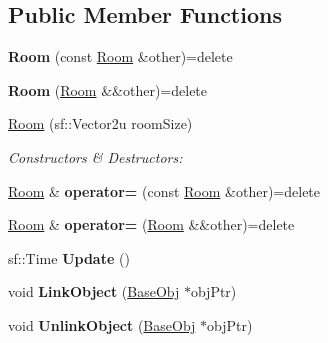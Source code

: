 \subsection*{Public Member Functions}
\begin{DoxyCompactItemize}
\item 
\hypertarget{class_helios_1_1_room_adde05da30e6a7923349d3682f77a595e}{}{\bfseries Room} (const \hyperlink{class_helios_1_1_room}{Room} \&other)=delete\label{class_helios_1_1_room_adde05da30e6a7923349d3682f77a595e}

\item 
\hypertarget{class_helios_1_1_room_a49dee88dbca1430546f49dedda0ef88a}{}{\bfseries Room} (\hyperlink{class_helios_1_1_room}{Room} \&\&other)=delete\label{class_helios_1_1_room_a49dee88dbca1430546f49dedda0ef88a}

\item 
\hypertarget{class_helios_1_1_room_a069b54c002742b2e943e281520654d43}{}\hyperlink{class_helios_1_1_room_a069b54c002742b2e943e281520654d43}{Room} (sf\+::\+Vector2u room\+Size)\label{class_helios_1_1_room_a069b54c002742b2e943e281520654d43}

\begin{DoxyCompactList}\small\item\em Constructors \& Destructors\+: \end{DoxyCompactList}\item 
\hypertarget{class_helios_1_1_room_ac4529d35e99e767f434e0c33f922257a}{}\hyperlink{class_helios_1_1_room}{Room} \& {\bfseries operator=} (const \hyperlink{class_helios_1_1_room}{Room} \&other)=delete\label{class_helios_1_1_room_ac4529d35e99e767f434e0c33f922257a}

\item 
\hypertarget{class_helios_1_1_room_a9f5645c1ec1a46c98ee7621c7a327723}{}\hyperlink{class_helios_1_1_room}{Room} \& {\bfseries operator=} (\hyperlink{class_helios_1_1_room}{Room} \&\&other)=delete\label{class_helios_1_1_room_a9f5645c1ec1a46c98ee7621c7a327723}

\item 
\hypertarget{class_helios_1_1_room_a26dd287e7d05d6157b97bd42ca4c5f54}{}sf\+::\+Time {\bfseries Update} ()\label{class_helios_1_1_room_a26dd287e7d05d6157b97bd42ca4c5f54}

\item 
\hypertarget{class_helios_1_1_room_a1dc648407daeb69bed664c1b6aca899d}{}void {\bfseries Link\+Object} (\hyperlink{class_helios_1_1_base_obj}{Base\+Obj} $\ast$obj\+Ptr)\label{class_helios_1_1_room_a1dc648407daeb69bed664c1b6aca899d}

\item 
\hypertarget{class_helios_1_1_room_ae94868797f3224f81604193f7e6e9af0}{}void {\bfseries Unlink\+Object} (\hyperlink{class_helios_1_1_base_obj}{Base\+Obj} $\ast$obj\+Ptr)\label{class_helios_1_1_room_ae94868797f3224f81604193f7e6e9af0}

\end{DoxyCompactItemize}


